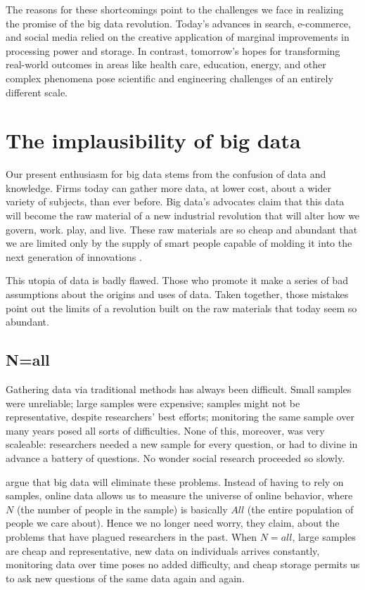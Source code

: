 \documentclass[12pt]{article}
\begin{document}
The reasons for these shortcomings point to the challenges we face in
realizing the promise of the big data revolution. Today's advances in
search, e-commerce, and social media relied on the creative
application of marginal improvements in processing power and
storage. In contrast, tomorrow's hopes for transforming real-world
outcomes in areas like health care, education, energy, and other
complex phenomena pose scientific and engineering challenges of an
entirely different scale. 


\section{The implausibility of big data}
\label{sec:convention-reality}


Our present enthusiasm for big data stems from the confusion of data
and knowledge. Firms today can gather more data, at lower cost, about
a wider variety of subjects, than ever before. Big data's
advocates claim that this data will become the raw material of a new
industrial revolution that will alter how we govern, work. play, and
live. These raw materials are so cheap and abundant that we are
limited only by the supply of smart people capable of molding it into
the next generation of innovations \citep{mckinsey2011}. 

This utopia of data is badly flawed. Those who promote it make a
series of bad assumptions about the origins and uses of data. Taken
together, those mistakes point out the limits of a revolution built
on the raw materials that today seem so abundant. 

\subsection{N=all}
\label{sec:n-equals-all}

Gathering data via traditional methods has always been
difficult. Small samples were unreliable; large samples were
expensive; samples might not be representative, despite researchers'
best efforts; monitoring the same sample over many years posed all
sorts of difficulties. None of this, moreover, was very scaleable:
researchers needed a new sample for every question, or had to divine
in advance a battery of questions. No wonder social
research proceeded so slowly.

\cite{mayer2013big} argue that big data will eliminate these
problems. Instead of having to rely on samples, online data allows us
to measure the universe of online behavior, where $N$ (the number of
people in the sample) is basically $All$ (the entire population of
people we care about). Hence we no longer need worry, they claim,
about the problems that have plagued researchers in the past. When
$N=all$, large samples are cheap and representative, new data on
individuals arrives constantly,  monitoring data over time poses no
added difficulty, and cheap storage permits us to ask new questions of
the same data again and again.
\end{document}
